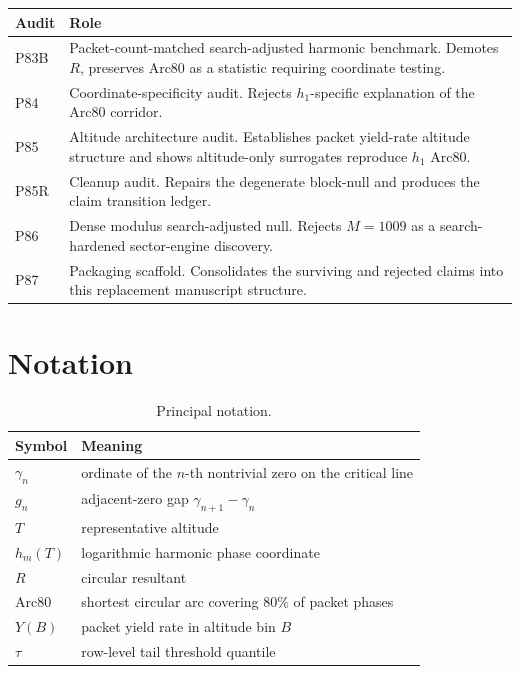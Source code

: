 \documentclass[11pt]{article}
\begin{document}
\begin{longtable}{p{}p{}}
\toprule
\textbf{Audit} & \textbf{Role} \\
\midrule
P83B & Packet-count-matched search-adjusted harmonic benchmark. Demotes \(R\), preserves Arc80 as a statistic requiring coordinate testing. \\
P84 & Coordinate-specificity audit. Rejects \(h_1\)-specific explanation of the Arc80 corridor. \\
P85 & Altitude architecture audit. Establishes packet yield-rate altitude structure and shows altitude-only surrogates reproduce \(h_1\) Arc80. \\
P85R & Cleanup audit. Repairs the degenerate block-null and produces the claim transition ledger. \\
P86 & Dense modulus search-adjusted null. Rejects \(M=1009\) as a search-hardened sector-engine discovery. \\
P87 & Packaging scaffold. Consolidates the surviving and rejected claims into this replacement manuscript structure. \\
\bottomrule
\end{longtable}

\section{Notation}

\begin{table}[H]
\centering
\small
\begin{tabular}{ll}
\toprule
\textbf{Symbol} & \textbf{Meaning} \\
\midrule
\(\gamma_n\) & ordinate of the \(n\)-th nontrivial zero on the critical line \\
\(g_n\) & adjacent-zero gap \(\gamma_{n+1}-\gamma_n\) \\
\(T\) & representative altitude \\
\(h_m(T)\) & logarithmic harmonic phase coordinate \\
\(R\) & circular resultant \\
Arc80 & shortest circular arc covering \(80\%\) of packet phases \\
\(Y(B)\) & packet yield rate in altitude bin \(B\) \\
\(\tau\) & row-level tail threshold quantile \\
\bottomrule
\end{tabular}
\caption{Principal notation.}
\end{table}
\end{document}
